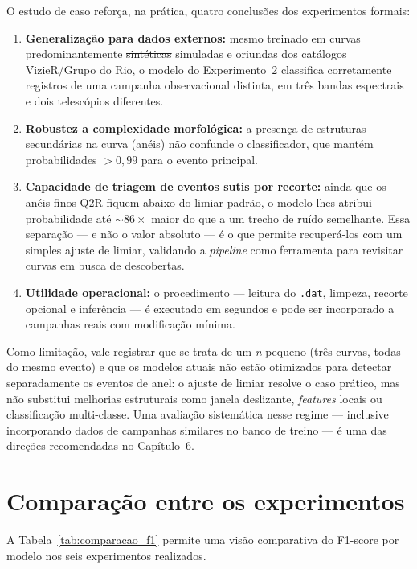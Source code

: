 \documentclass[msc]{on} %
\makeatletter
\providecommand{\DIFaddtex}[1]{{\protect\color{red}#1}} %
\providecommand{\DIFdeltex}[1]{{\protect\color{red}\sout{#1}}} %
\providecommand{\DIFaddbegin}{} %
\providecommand{\DIFaddend}{} %
\providecommand{\DIFdelbegin}{} %
\providecommand{\DIFdelend}{} %
\providecommand{\DIFadd}[1]{\texorpdfstring{\DIFaddtex{#1}}{#1}} %
\providecommand{\DIFdel}[1]{\texorpdfstring{\DIFdeltex{#1}}{}} %
\let\sout@orig\sout %
\renewcommand{\sout}[1]{\ifmmode\text{\sout@orig{\ensuremath{#1}}}\else\sout@orig{#1}\fi} %
\makeatother
\begin{document}
O estudo de caso reforça, na prática, quatro conclusões dos experimentos formais:

\begin{enumerate}
	\item \textbf{Generalização para dados externos:} mesmo treinado em curvas predominantemente \DIFdelbegin \DIFdel{sintéticas }\DIFdelend \DIFaddbegin \DIFadd{simuladas }\DIFaddend e oriundas dos catálogos VizieR/Grupo do Rio, o modelo do Experimento~2 classifica corretamente registros de uma campanha observacional distinta, em três bandas espectrais e dois telescópios diferentes.
	\item \textbf{Robustez a complexidade morfológica:} a presença de estruturas secundárias na curva (anéis) não confunde o classificador, que mantém probabilidades $> 0{,}99$ para o evento principal.
	\item \textbf{Capacidade de triagem de eventos sutis por recorte:} ainda que os anéis finos Q2R fiquem abaixo do limiar padrão, o modelo lhes atribui probabilidade até $\sim 86\times$ maior do que a um trecho de ruído semelhante. Essa separação --- e não o valor absoluto --- é o que permite recuperá-los com um simples ajuste de limiar, validando a \textit{pipeline} como ferramenta para revisitar curvas em busca de descobertas.
	\item \textbf{Utilidade operacional:} o procedimento --- leitura do \texttt{.dat}, limpeza, recorte opcional e inferência --- é executado em segundos e pode ser incorporado a campanhas reais com modificação mínima.
\end{enumerate}

Como limitação, vale registrar que se trata de um \textit{n} pequeno (três curvas, todas do mesmo evento) e que os modelos atuais não estão otimizados para detectar separadamente os eventos de anel: o ajuste de limiar resolve o caso prático, mas não substitui melhorias estruturais como janela deslizante, \textit{features} locais ou classificação multi-classe. Uma avaliação sistemática nesse regime --- inclusive incorporando dados de campanhas similares no banco de treino --- é uma das direções recomendadas no Capítulo~6.

\section{Comparação entre os experimentos}
\label{sec:comparacao}

A Tabela~\ref{tab:comparacao_f1} permite uma visão comparativa do F1-score por modelo nos seis experimentos realizados.
\end{document}
